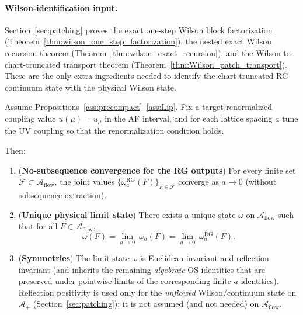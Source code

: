 \paragraph{Wilson-identification input.}
Section~\ref{sec:patching} proves the exact one-step Wilson block factorization (Theorem~\ref{thm:wilson_one_step_factorization}), the nested exact Wilson recursion theorem (Theorem~\ref{thm:wilson_exact_recursion}), and the Wilson-to-chart-truncated transport theorem (Theorem~\ref{thm:Wilson_patch_transport}).
These are the only extra ingredients needed to identify the chart-truncated RG continuum state with the physical Wilson state.

\begin{theorem}[C3-U closure]\label{thm:C3U}
Assume Propositions~\ref{ass:precompact}--\ref{ass:Lip}.
Fix a target renormalized coupling value $u(\mu)=u_\mu$ in the AF interval, and for each lattice spacing $a$ tune the UV coupling so that the renormalization condition holds.

Then:
\begin{enumerate}[label=(\alph*)]
\item (\textbf{No-subsequence convergence for the RG outputs}) For every finite set $\mathcal F\subset\mathcal A_{\mathrm{flow}}$,
the joint values $\{\omega^{\mathrm{RG}}_a(F)\}_{F\in\mathcal F}$ converge as $a\to 0$ (without subsequence extraction).

\item (\textbf{Unique physical limit state}) There exists a unique state $\omega$ on $\mathcal A_{\mathrm{flow}}$ such that for all $F\in\mathcal A_{\mathrm{flow}}$,
\[
\omega(F)=\lim_{a\to 0}\ \omega_a(F)=\lim_{a\to 0}\ \omega^{\mathrm{RG}}_a(F).
\]

\item (\textbf{Symmetries}) The limit state $\omega$ is Euclidean invariant and reflection invariant (and inherits the remaining \emph{algebraic} OS identities
that are preserved under pointwise limits of the corresponding finite-$a$ identities).
Reflection positivity is used only for the \emph{unflowed} Wilson/continuum state on $\mathcal A_{+}$ (Section~\ref{sec:patching}); it is not assumed (and not needed) on $\mathcal A_{\mathrm{flow}}$.
\end{enumerate}
\end{theorem}

